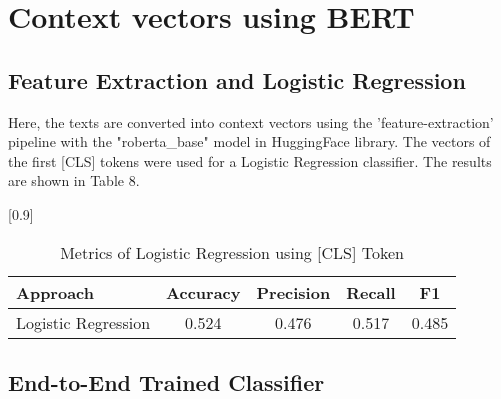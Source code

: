 \documentclass[a4paper,11pt]{article}
\begin{document}


\section{Context vectors using BERT}

\subsection{Feature Extraction and Logistic Regression}
Here, the texts are converted into context vectors using the 'feature-extraction' pipeline with the "roberta\_base" model in HuggingFace library.
The vectors of the first [CLS] tokens were used for a Logistic Regression classifier.
The results are shown in Table 8.

\begin{table}[htbp]
    \centering
    \caption{Metrics of Logistic Regression using [CLS] Token}
    \scalebox{0.9}[0.9]{
    \begin{tabular}{l|cccc}
         Approach & Accuracy & Precision & Recall & F1 \\ \hline 
         Logistic Regression & 0.524 & 0.476 & 0.517 & 0.485 \\ 

    \end{tabular}

    }
\end{table}
\subsection{End-to-End Trained Classifier}


\end{document}
